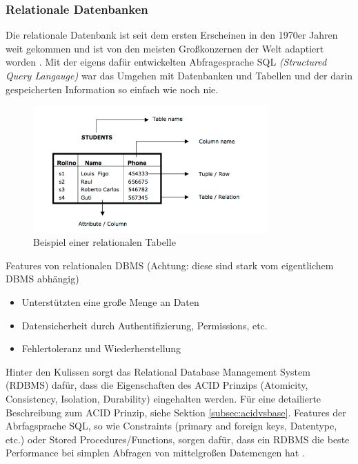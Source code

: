 \subsubsection{Relationale Datenbanken}
\label{subsec:relationaleDB}

Die relationale Datenbank ist seit dem ersten Erscheinen in den 1970er Jahren weit gekommen und ist von den meisten Großkonzernen der Welt adaptiert worden \cite{MELD.CH2-relationaleDB.ranking}. Mit der eigens dafür entwickelten Abfragesprache SQL \textit{(Structured Query Langauge)} war das Umgehen mit Datenbanken und Tabellen und der darin gespeicherten Information so einfach wie noch nie.

\begin{figure}[!htb]\centering
	\includegraphics[width=0.8\textwidth]{images/relationaleTabelle}
	\caption{Beispiel einer relationalen Tabelle}
\end{figure}

Features von relationalen DBMS (Achtung: diese sind stark vom eigentlichem DBMS abhängig)
\begin{itemize}
\item Unterstützten eine große Menge an Daten
\item Datensicherheit durch Authentifizierung, Permissions, etc.
\item Fehlertoleranz und Wiederherstellung
\end{itemize}

Hinter den Kulissen sorgt das Relational Database Management System (RDBMS) dafür, dass die Eigenschaften des ACID Prinzips (Atomicity, Consistency, Isolation, Durability) eingehalten werden. Für eine detailierte Beschreibung zum ACID Prinzip, siehe Sektion \ref{subsec:acidvsbase}. Features der Abrfagsprache SQL, so wie Constraints (primary and foreign keys, Datentype, etc.) oder Stored Procedures/Functions, sorgen dafür, dass ein RDBMS die beste Performance bei simplen Abfragen von mittelgroßen Datemengen hat \cite{MELD.CH2-relationaleDB.performacne}.

